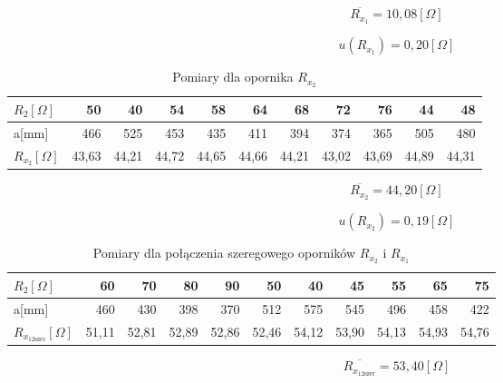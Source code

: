 \documentclass [a4paper,11pt]{article}
\begin{document}
\begin{equation}
\overline{ R_{x_1}} = 10,08 [\Omega]
\label{eq:R_x1śr} 
\end{equation}

\begin{equation}
u(R_{x_1}) = 0,20 [\Omega]
\label{eq:R_x1_delta} 
\end{equation}



\begin{table}[H]
\centering
\begin{tabular}{|l|r|r|r|r|r|r|r|r|r|r|}
\hline
$R_2[\Omega]$ & 50    & 40    & 54    & 58    & 64    & 68    & 72    & 76    & 44    & 48    \\
\hline
a[mm]  & 466   & 525   & 453   & 435   & 411   & 394   & 374   & 365   & 505   & 480   \\
\hline
$R_{x_2}[\Omega]$& 43,63 & 44,21 & 44,72 & 44,65 & 44,66 & 44,21 & 43,02 & 43,69 & 44,89 & 44,31 \\
\hline
\end{tabular}
\caption{Pomiary dla opornika $R_{x_2}$}
\label{tab:Rx2}
\end{table}


\begin{equation}
\overline{ R_{x_2}} = 44,20 [\Omega]
\label{eq:R_x2śr} 
\end{equation}

\begin{equation}
u(R_{x_2}) = 0,19 [\Omega]
\label{eq:R_x2_delta} 
\end{equation}

\begin{table}[H]
\centering
\begin{tabular}{|l|r|r|r|r|r|r|r|r|r|r|}
\hline
$R_2[\Omega]$   & 60    & 70    & 80    & 90    & 50    & 40    & 45    & 55    & 65    & 75    \\
\hline
a[mm]   & 460   & 430   & 398   & 370   & 512   & 575   & 545   & 496   & 458   & 422   \\
\hline
$R_{x_{12\text{szer}}}[\Omega]$  & 51,11 & 52,81 & 52,89 & 52,86 & 52,46 & 54,12 & 53,90 & 54,13 & 54,93 & 54,76 \\
\hline
\end{tabular}
\caption{Pomiary dla połączenia szeregowego oporników $R_{x_2}$ i $R_{x_1}$}
\label{tab:Rx12szer}
\end{table}

\begin{equation}
\overline{R_{x_{12\text{szer}}}} = 53,40 [\Omega]
\label{eq:R_x12szer_śr} 
\end{equation}
\end{document}
